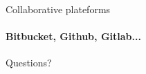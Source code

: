 \documentclass[english]{slides}
\begin{document}
\begin{frame}{Collaborative plateforms }
\framesubtitle{Bitbucket, Github, Gitlab...}
\end{frame}


\begin{frame}
\begin{center}\huge
Questions?
\end{center}
\end{frame}
\end{document}
